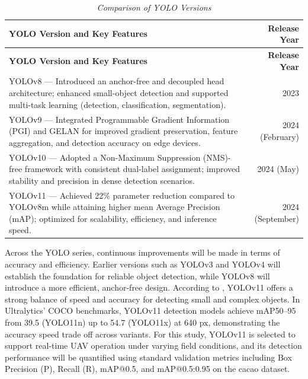 \begin{longtable}{p{8cm} r}
	\caption{\textit{Comparison of YOLO Versions}} \label{tab:yolo_comparison} \\
	
	\toprule
	\textbf{YOLO Version and Key Features} & \textbf{Release Year} \\
	\midrule
	\endfirsthead
	
	\toprule
	\textbf{YOLO Version and Key Features} & \textbf{Release Year} \\
	\midrule
	\endhead
	
	\bottomrule
	\endfoot
	
	YOLOv8 — Introduced an anchor-free and decoupled head architecture; enhanced small-object detection and supported multi-task learning (detection, classification, segmentation). & 2023 \\
	\midrule
	YOLOv9 — Integrated Programmable Gradient Information (PGI) and GELAN for improved gradient preservation, feature aggregation, and detection accuracy on edge devices. & 2024 (February) \\
	\midrule
	YOLOv10 — Adopted a Non-Maximum Suppression (NMS)-free framework with consistent dual-label assignment; improved stability and precision in dense detection scenarios. & 2024 (May) \\
	\midrule
	YOLOv11 — Achieved 22\% parameter reduction compared to YOLOv8m while attaining higher mean Average Precision (mAP); optimized for scalability, efficiency, and inference speed. & 2024 (September) \\
\end{longtable}

Across the YOLO series, continuous improvements will be made in terms of accuracy and efficiency. Earlier versions such as YOLOv3 and YOLOv4 will establish the foundation for reliable object detection, while YOLOv8 will introduce a more efficient, anchor-free design. According to \cite{UltralyticsBlog2025}, YOLOv11 offers a strong balance of speed and accuracy for detecting small and complex objects. In Ultralytics’ COCO benchmarks, YOLOv11 detection models achieve mAP50–95 from 39.5 (YOLO11n) up to 54.7 (YOLO11x) at 640 px, demonstrating the accuracy speed trade off across variants. For this study, YOLOv11 is selected to support real-time UAV operation under varying field conditions, and its detection performance will be quantified using standard validation metrics including Box Precision (P), Recall (R), mAP@0.5, and mAP@0.5:0.95 on the cacao dataset.

